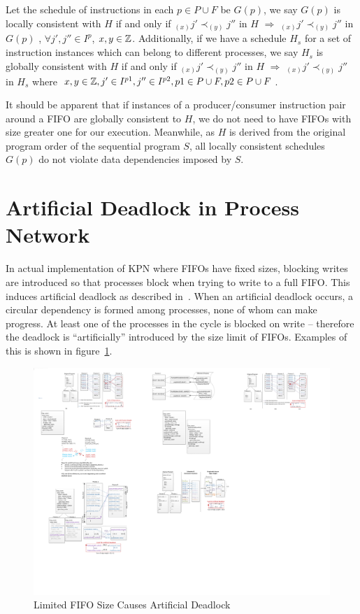 \begin{definition}
Let the schedule of instructions in each $p \in P \cup F$ be $G(p)$, we say $G(p)$ is locally consistent with $H$ if
and only if
$_{(x)}j' \prec _{(y)}j''$ in $H$ $\Rightarrow$ $_{(x)}j' \prec _{(y)}j''$ in $G(p)$
, $\forall j', j'' \in I^p$, 
$x, y \in \Bbb{Z}$. Additionally, if we have a schedule $H_s$ for a set of instruction instances  which can belong to different processes, we say $H_s$ is globally consistent with
$H$ if and only if $_{(x)}j' \prec _{(y)}j''$ in $H$ $\Rightarrow$ $_{(x)}j' \prec _{(y)}j''$ in $H_s$
 where  $x,y \in \Bbb{Z}, j' \in I^{p1}, j'' \in I^{p2}, p1 \in P \cup F, p2 \in P \cup F$.
\end{definition}


It should be apparent that if instances of a producer/consumer
instruction pair around a FIFO are globally consistent to $H$, we
do not need to have FIFOs with size greater one for our execution.
Meanwhile, as $H$ is derived from the original program order of
the sequential program $S$, all locally consistent schedules $G(p)$ 
do not violate data dependencies imposed by $S$.


\section{Artificial Deadlock in Process Network}
In actual implementation of KPN where FIFOs have fixed sizes, blocking
writes are introduced so that processes block when trying to write to a full FIFO.
This induces artificial deadlock as described in~\cite{Geilen:2003:REK:1765712.1765736}. 
When an artificial deadlock occurs, a circular dependency is formed among
processes, none of whom can make progress. At least one of the processes
in the cycle is blocked on write -- therefore the deadlock is ``artificially''
introduced by the size limit of FIFOs. Examples of this is shown in figure~\ref{fig:artificalDeadlock}. 



\begin{figure}[htp]
\begin{center}
\includegraphics[width=0.8\linewidth]{chap4fig/artificialDeadlock.pdf}
\caption{Limited FIFO Size Causes Artificial Deadlock
\label{fig:artificalDeadlock}}
\end{center}
\end{figure}


